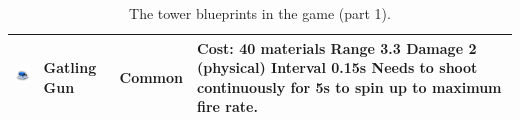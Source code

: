 \begin{table}[H]
\begin{tabular}{m{15mm}m{20mm}lm{}}
        \includegraphics[height=15mm]{img/Icons/Towers/Gatling Gun.png}   & Gatling Gun   & Common          &
        \footnotesize{\textbf{Cost: 40 materials} \newline Range 3.3 \newline Damage 2 (physical) \newline Interval 0.15s \newline Needs to shoot continuously for 5s to spin up to maximum fire rate.}                                                                                                                                         \\
        \bottomrule
    \end{tabular}
    \caption{The tower blueprints in the game (part 1).}
    \label{tab:towers1}
\end{table}



